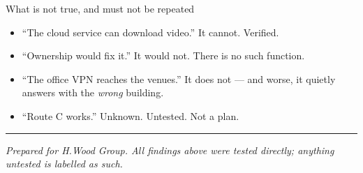 \documentclass[11pt,a4paper]{article}
\begin{document}
\begin{alert}{What is not true, and must not be repeated}
\begin{itemize}[leftmargin=14pt,itemsep=2pt]
  \item ``The cloud service can download video.'' It cannot. Verified.
  \item ``Ownership would fix it.'' It would not. There is no such function.
  \item ``The office VPN reaches the venues.'' It does not --- and worse, it
        quietly answers with the \emph{wrong} building.
  \item ``Route C works.'' Unknown. Untested. Not a plan.
\end{itemize}
\end{alert}

\vspace{10pt}\hrule\vspace{6pt}
{\small\itshape Prepared for H.Wood Group. All findings above were tested
directly; anything untested is labelled as such.}
\end{document}
